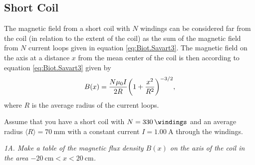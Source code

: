 \documentclass[../Elmag-labhefte-2020.tex]{subfiles}
\begin{document}
\subsection{Short Coil}

The magnetic field from a short coil with $N$ windings can be considered far from the coil (in relation to the extent of the coil) as the sum of the magnetic field from $N$ current loops given in equation \eqref{eq:Biot.Savart3}. The magnetic field on the axis at a distance $x$ from the mean center
of the coil is then according to equation \eqref{eq:Biot.Savart3} given by
%
\begin{equation}
    B(x) = \frac{N\mu_0 I}{2 R} \qty(1 + \frac{x^{2}}{R^{2}})^{-3/2},
    \label{eq:kort.spole}
\end{equation}
%
where $R$ is the average radius of the current loops.

Assume that you have a short coil with $N = \SI{330}{\windings}$ and an average radius $\langle R \rangle  = \SI{70}{\mm}$ with a constant current $I = \SI{1.00}{\ampere}$ through the windings.

\emph{1A. Make a table of the magnetic flux density $B(x)$ on the axis of the coil in the area $-\SI{20}{\cm} < x < \SI{20}{\cm}$.}
\end{document}
